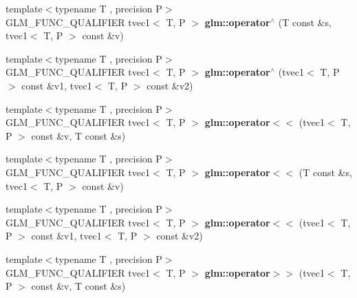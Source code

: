 \begin{DoxyCompactItemize}
\item 
\hypertarget{namespaceglm_a7603b2f9093e2ff2cd03a2ab09844d82}{{\footnotesize template$<$typename T , precision P$>$ }\\G\-L\-M\-\_\-\-F\-U\-N\-C\-\_\-\-Q\-U\-A\-L\-I\-F\-I\-E\-R tvec1$<$ T, P $>$ {\bfseries glm\-::operator$^\wedge$} (T const \&s, tvec1$<$ T, P $>$ const \&v)}\label{namespaceglm_a7603b2f9093e2ff2cd03a2ab09844d82}

\item 
\hypertarget{namespaceglm_ab1bd800c3747bf636e32a27e1200b811}{{\footnotesize template$<$typename T , precision P$>$ }\\G\-L\-M\-\_\-\-F\-U\-N\-C\-\_\-\-Q\-U\-A\-L\-I\-F\-I\-E\-R tvec1$<$ T, P $>$ {\bfseries glm\-::operator$^\wedge$} (tvec1$<$ T, P $>$ const \&v1, tvec1$<$ T, P $>$ const \&v2)}\label{namespaceglm_ab1bd800c3747bf636e32a27e1200b811}

\item 
\hypertarget{namespaceglm_a34d6faa7545b08691e79184f8f93b90d}{{\footnotesize template$<$typename T , precision P$>$ }\\G\-L\-M\-\_\-\-F\-U\-N\-C\-\_\-\-Q\-U\-A\-L\-I\-F\-I\-E\-R tvec1$<$ T, P $>$ {\bfseries glm\-::operator$<$$<$} (tvec1$<$ T, P $>$ const \&v, T const \&s)}\label{namespaceglm_a34d6faa7545b08691e79184f8f93b90d}

\item 
\hypertarget{namespaceglm_addad5cba03cb902bc697dc313a4996d9}{{\footnotesize template$<$typename T , precision P$>$ }\\G\-L\-M\-\_\-\-F\-U\-N\-C\-\_\-\-Q\-U\-A\-L\-I\-F\-I\-E\-R tvec1$<$ T, P $>$ {\bfseries glm\-::operator$<$$<$} (T const \&s, tvec1$<$ T, P $>$ const \&v)}\label{namespaceglm_addad5cba03cb902bc697dc313a4996d9}

\item 
\hypertarget{namespaceglm_a18bc5532629133c9f2073b928778cc5c}{{\footnotesize template$<$typename T , precision P$>$ }\\G\-L\-M\-\_\-\-F\-U\-N\-C\-\_\-\-Q\-U\-A\-L\-I\-F\-I\-E\-R tvec1$<$ T, P $>$ {\bfseries glm\-::operator$<$$<$} (tvec1$<$ T, P $>$ const \&v1, tvec1$<$ T, P $>$ const \&v2)}\label{namespaceglm_a18bc5532629133c9f2073b928778cc5c}

\item 
\hypertarget{namespaceglm_a72d788910213eb69928d94c9391f83ca}{{\footnotesize template$<$typename T , precision P$>$ }\\G\-L\-M\-\_\-\-F\-U\-N\-C\-\_\-\-Q\-U\-A\-L\-I\-F\-I\-E\-R tvec1$<$ T, P $>$ {\bfseries glm\-::operator$>$$>$} (tvec1$<$ T, P $>$ const \&v, T const \&s)}\label{namespaceglm_a72d788910213eb69928d94c9391f83ca}


\end{DoxyCompactItemize}
